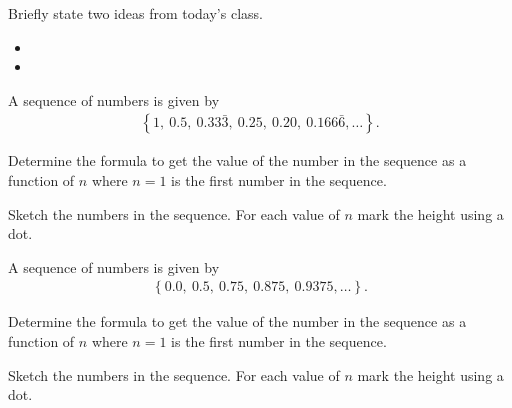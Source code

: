 \begin{problem}
\item Briefly state two ideas from today's class.
  \begin{itemize}
  \item 
  \item 
  \end{itemize}

  \item A sequence of numbers is given by
    \begin{eqnarray*}
      \left\{ 1,~0.5,~0.33\bar{3},~0.25,~0.20,~0.166\bar{6}, \ldots \right\}.
    \end{eqnarray*}

    \begin{subproblem}
    \item Determine the formula to get the value of the number in the
      sequence as a function of $n$ where $n=1$ is the first number in
      the sequence.

      \vfill

    \item Sketch the numbers in the sequence. For each value of $n$
      mark the height using a dot.

      \scalebox{0.8}{}

    \end{subproblem}


  \item A sequence of numbers is given by
    \begin{eqnarray*}
      \left\{ 0.0,~0.5,~0.75,~0.875,~0.9375, \ldots \right\}.
    \end{eqnarray*}

    \begin{subproblem}
    \item Determine the formula to get the value of the number in the
      sequence as a function of $n$ where $n=1$ is the first number in
      the sequence.

      \vfill

    \item Sketch the numbers in the sequence. For each value of $n$
      mark the height using a dot.

      \scalebox{0.8}{}

    \end{subproblem}
\end{problem}



